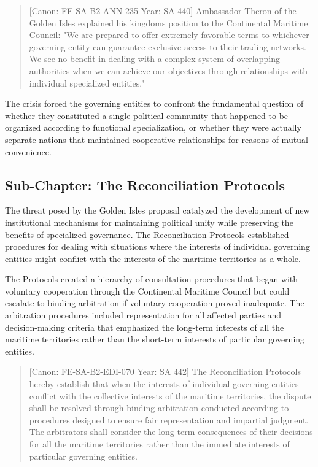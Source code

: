 \begin{quote}
{[}Canon: FE-SA-B2-ANN-235 \textbar{} Year: SA 440{]} Ambassador Theron
of the Golden Isles explained his kingdom\textquotesingle s position to
the Continental Maritime Council: "We are prepared to offer extremely
favorable terms to whichever governing entity can guarantee exclusive
access to their trading networks. We see no benefit in dealing with a
complex system of overlapping authorities when we can achieve our
objectives through relationships with individual specialized entities."
\end{quote}

The crisis forced the governing entities to confront the fundamental
question of whether they constituted a single political community that
happened to be organized according to functional specialization, or
whether they were actually separate nations that maintained cooperative
relationships for reasons of mutual convenience.

\subsection{Sub-Chapter: The Reconciliation
Protocols}\label{sub-chapter-the-reconciliation-protocols}

The threat posed by the Golden Isles proposal catalyzed the development
of new institutional mechanisms for maintaining political unity while
preserving the benefits of specialized governance. The Reconciliation
Protocols established procedures for dealing with situations where the
interests of individual governing entities might conflict with the
interests of the maritime territories as a whole.

The Protocols created a hierarchy of consultation procedures that began
with voluntary cooperation through the Continental Maritime Council but
could escalate to binding arbitration if voluntary cooperation proved
inadequate. The arbitration procedures included representation for all
affected parties and decision-making criteria that emphasized the
long-term interests of all the maritime territories rather than the
short-term interests of particular governing entities.

\begin{quote}
{[}Canon: FE-SA-B2-EDI-070 \textbar{} Year: SA 442{]} The Reconciliation
Protocols hereby establish that when the interests of individual
governing entities conflict with the collective interests of the
maritime territories, the dispute shall be resolved through binding
arbitration conducted according to procedures designed to ensure fair
representation and impartial judgment. The arbitrators shall consider
the long-term consequences of their decisions for all the maritime
territories rather than the immediate interests of particular governing
entities.
\end{quote}

